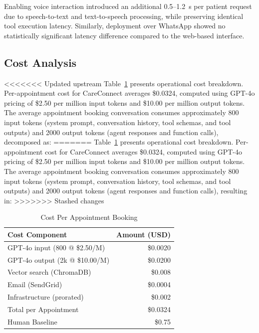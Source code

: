 \documentclass[conference]{IEEEtran}
\begin{document}
Enabling voice interaction introduced an additional 0.5--1.2~s per patient request due to speech-to-text and text-to-speech processing, while preserving identical tool execution latency. Similarly, deployment over WhatsApp showed no statistically significant latency difference compared to the web-based interface.

\subsection{Cost Analysis}

<<<<<<< Updated upstream
Table~\ref{tab:cost} presents operational cost breakdown. Per-appointment cost for CareConnect averages \$0.0324, computed using GPT-4o pricing of \$2.50 per million input tokens and \$10.00 per million output tokens. The average appointment booking conversation consumes approximately 800 input tokens (system prompt, conversation history, tool schemas, and tool outputs) and 2000 output tokens (agent responses and function calls), decomposed as:
=======
Table~\ref{tab:cost} presents operational cost breakdown. Per-appointment cost for CareConnect averages \$0.0324, computed using GPT-4o pricing of \$2.50 per million input tokens and \$10.00 per million output tokens. The average appointment booking conversation consumes approximately 800 input tokens (system prompt, conversation history, tool schemas, and tool outputs) and 2000 output tokens (agent responses and function calls), resulting in:
>>>>>>> Stashed changes

\begin{table}[ht]
\caption{Cost Per Appointment Booking}
\begin{center}
\begin{tabular}{|l|r|}
\hline
Cost Component & Amount (USD) \\
\hline
GPT-4o input (800 @ \$2.50/M) & \$0.0020 \\
GPT-4o output (2k @ \$10.00/M) & \$0.0200 \\
Vector search (ChromaDB) & \$0.008 \\
Email (SendGrid) & \$0.0004 \\
Infrastructure (prorated) & \$0.002 \\
\hline
Total per Appointment & \$0.0324 \\
\hline
Human Baseline & \$0.75 \\
\hline
\end{tabular}
\label{tab:cost}
\end{center}
\end{table}
\end{document}
